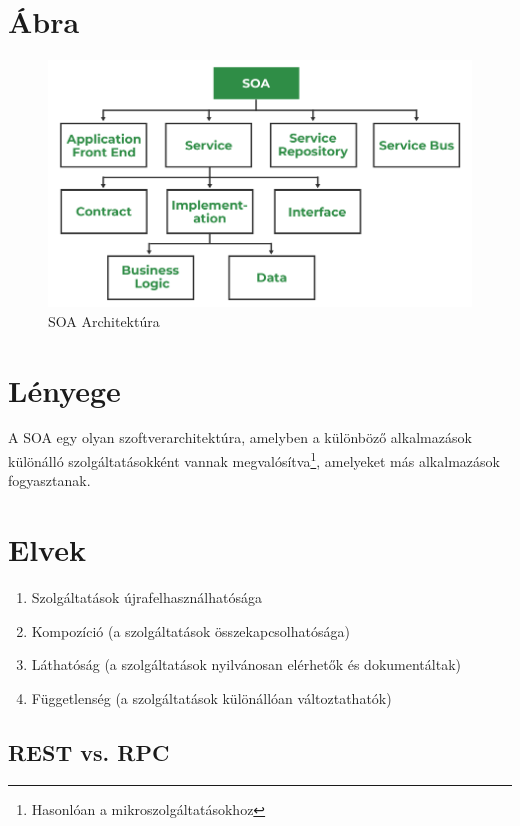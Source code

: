 \documentclass{report}
\begin{document}
				\section*{Ábra}
					\begin{figure}[h]
					    \centering
					    \includegraphics[width=1\textwidth]{figures/SOA.png}
					    \caption{SOA Architektúra}
					    \label{fig:SOA Architektúra}
					\end{figure}
				
				\section*{Lényege}
				A SOA egy olyan szoftverarchitektúra, amelyben a különböző alkalmazások különálló szolgáltatásokként vannak megvalósítva\footnote{Hasonlóan a mikroszolgáltatásokhoz}, amelyeket más alkalmazások fogyasztanak.

				
				\section*{Elvek}
					\begin{enumerate}
					    \item Szolgáltatások újrafelhasználhatósága
					    \item Kompozíció (a szolgáltatások összekapcsolhatósága)
					    \item Láthatóság (a szolgáltatások nyilvánosan elérhetők és dokumentáltak)
					    \item Függetlenség (a szolgáltatások különállóan változtathatók)
					\end{enumerate}
				
			\subsection{REST vs. RPC}
				
\end{document}
